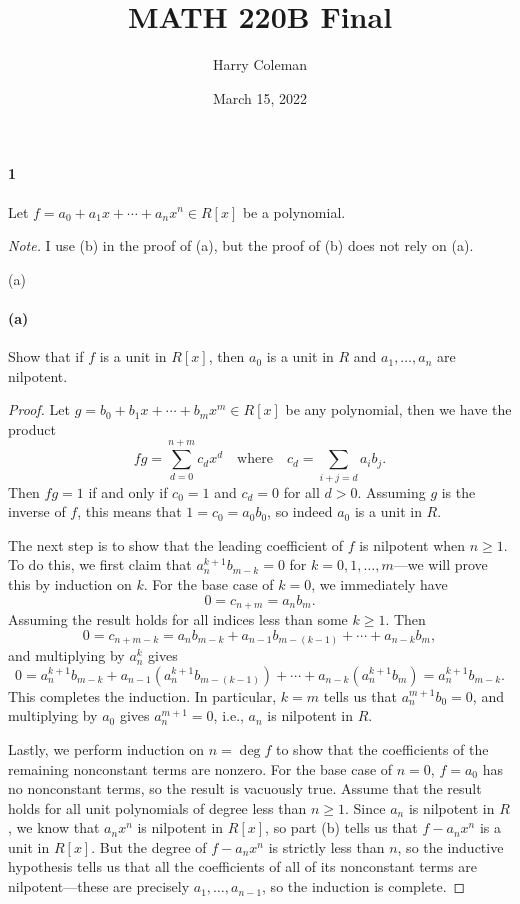 \documentclass[12pt]{article}
\renewcommand{\maketitle}{\thispagestyle{title}}
\newlength{\myparskip}
\newenvironment{fullbox}{\begin{lrbox}{\savefullbox}\begin{minipage}{\dimexpr\textwidth-2\fboxsep\relax}\setlength{\parskip}{\myparskip}}{\end{minipage}\end{lrbox}\framebox[\textwidth]{\usebox{\savefullbox}}}
\newenvironment{pbox}[1][]{\begin{fullbox}\ifx#1\empty\else\paragraph{#1}\phantom{}\fi}{\end{fullbox}}
\theoremstyle{definition}
\newcommand{\isp}[1]{\quad\text{#1}\quad}
\newcommand{\<}{\langle}
\renewcommand{\>}{\rangle}
\begin{document}
\title{MATH 220B Final}
\author{Harry Coleman}
\date{March 15, 2022}
\maketitle

\begin{pbox}[1]
    Let $f=a_0+a_1x+\cdots+a_nx^n\in R[x]$ be a polynomial.
\end{pbox}

\textit{Note.} I use (b) in the proof of (a), but the proof of (b) does not rely on (a).

\begin{pbox}[(a)]
    Show that if $f$ is a unit in $R[x]$, then $a_0$ is a unit in $R$ and $a_1,\dots,a_n$ are nilpotent.
\end{pbox}

\begin{proof}
    Let $g = b_0 + b_1x + \cdots + b_m x^m \in R[x]$ be any polynomial, then we have the product
    \[
        fg = \sum_{d=0}^{n+m} c_dx^d \isp{where} c_d = \sum_{i + j = d} a_i b_j.
    \]
    Then $fg = 1$ if and only if $c_0 = 1$ and $c_d = 0$ for all $d > 0$.
    Assuming $g$ is the inverse of $f$, this means that $1 = c_0 = a_0 b_0$, so indeed $a_0$ is a unit in $R$.

    The next step is to show that the leading coefficient of $f$ is nilpotent when $n \geq 1$.
    To do this, we first claim that $a_n^{k+1}b_{m-k} = 0$ for $k = 0, 1, \dots, m$---we will prove this by induction on $k$.
    For the base case of $k = 0$, we immediately have
    \[
        0 = c_{n + m} = a_nb_m.
    \]
    Assuming the result holds for all indices less than some $k \geq 1$.
    Then
    \[
        0 = c_{n + m - k} = a_nb_{m - k} + a_{n-1}b_{m-(k-1)} + \cdots + a_{n-k}b_m,
    \]
    and multiplying by $a_n^k$ gives
    \[
        0
            = a_n^{k+1}b_{m-k} + a_{n-1}(a_n^{k+1}b_{m-(k-1)}) + \cdots + a_{n-k}(a_n^{k+1}b_m)
            = a_n^{k+1}b_{m-k}.
    \]
    This completes the induction.
    In particular, $k = m$ tells us that $a_n^{m+1}b_0 = 0$, and multiplying by $a_0$ gives $a_n^{m+1} = 0$, i.e., $a_n$ is nilpotent in $R$.

    Lastly, we perform induction on $n = \deg f$ to show that the coefficients of the remaining nonconstant terms are nonzero.
    For the base case of $n = 0$, $f = a_0$ has no nonconstant terms, so the result is vacuously true.
    Assume that the result holds for all unit polynomials of degree less than $n \geq 1$.
    Since $a_n$ is nilpotent in $R$, we know that $a_nx^n$ is nilpotent in $R[x]$, so part (b) tells us that $f - a_nx^n$ is a unit in $R[x]$.
    But the degree of $f - a_nx^n$ is strictly less than $n$, so the inductive hypothesis tells us that all the coefficients of all of its nonconstant terms are nilpotent---these are precisely $a_1, \dots, a_{n-1}$, so the induction is complete.
\end{proof}
\end{document}
